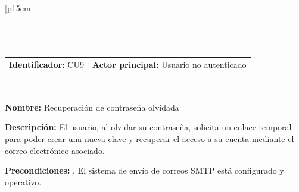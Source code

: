 \begingroup
{}
\setlength{\arrayrulewidth}{1pt}
\begin{longtable}{|p{15cm}|}
  \hline
   \\
  \hline
  \endfirsthead
   \\
  \hline
   \\
  \hline
  \endhead
  \hline {} \\ \hline
  \endfoot
  \hline
  \caption{Caso de uso 9 — Recuperación de contraseña olvidada.}
  \label{TB:CU9_RECUPERAR_PASSWORD}
  \endlastfoot

  \begin{tabularx}{\linewidth}{@{}X X@{}}
    \textbf{Identificador:} CU9 & \textbf{Actor principal:} Usuario no autenticado
  \end{tabularx} \\ \hline

  \textbf{Nombre:} Recuperación de contraseña olvidada \\ \hline

  \textbf{Descripción:} \newline 
  El usuario, al olvidar su contraseña, solicita un enlace temporal para poder crear una nueva clave y recuperar el acceso a su cuenta mediante el correo electrónico asociado. \\ \hline

  \textbf{Precondiciones:} . El sistema de envío de correos SMTP está configurado y operativo. \\ \hline


\end{longtable}
